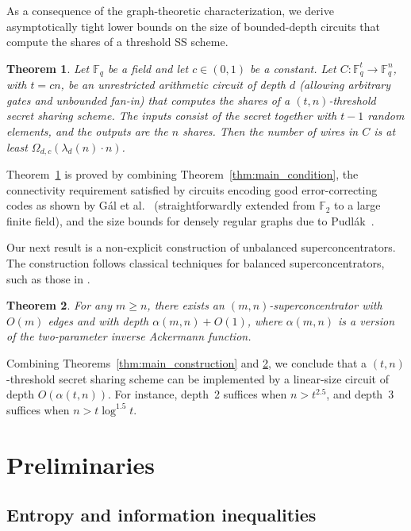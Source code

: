 \documentclass[11pt]{article}
\newtheorem{theorem}{Theorem}
\begin{document}
As a consequence of the graph-theoretic characterization, we derive asymptotically tight lower bounds on the size of bounded-depth circuits that compute the shares of a threshold SS scheme.

\begin{theorem}
\label{thm:ss_ckt_lb}
Let \(\mathbb{F}_q\) be a field and let \(c \in (0,1)\) be a constant.
Let \(C : \mathbb{F}_q^{t} \to \mathbb{F}_q^{n}\), with \(t = cn\), be an
unrestricted arithmetic circuit of depth \(d\) (allowing arbitrary gates
and unbounded fan-in) that computes the shares of a \((t,n)\)-threshold
secret sharing scheme. The inputs consist of the secret together with
\(t-1\) random elements, and the outputs are the \(n\) shares.
Then the number of wires in \(C\) is at least $\Omega_{d, c}\!\left(\lambda_d(n)\cdot n\right)$.
\end{theorem}

Theorem~\ref{thm:ss_ckt_lb} is proved by combining Theorem~\ref{thm:main_condition}, the connectivity requirement satisfied by circuits encoding good error-correcting codes as shown by G{\'a}l et al.~\cite{gal2013tight} (straightforwardly extended from $\mathbb{F}_2$ to a large finite field), and the size bounds for densely regular graphs due to Pudl{\'a}k~\cite{Pud94}.

Our next result is a non-explicit construction of unbalanced superconcentrators. The construction follows classical techniques for balanced superconcentrators, such as those in \cite{Pinsker73, Val77, DDPW83}.

\begin{theorem}
\label{thm:main_sc}
For any $m \ge n$, there exists an $(m, n)$-superconcentrator with $O(m)$ edges and with depth $\alpha(m, n) + O(1)$, where $\alpha(m, n)$ is a version of the two-parameter inverse Ackermann function. 
\end{theorem}

Combining Theorems~\ref{thm:main_construction} and \ref{thm:main_sc}, we conclude that a $(t, n)$-threshold secret sharing scheme can be implemented by a linear-size circuit of depth $O(\alpha(t, n))$. For instance, depth~2 suffices when $n > t^{2.5}$, and depth~3 suffices when $n > t \log^{1.5} t$.


\section{Preliminaries}

\subsection{Entropy and information inequalities}
\end{document}
